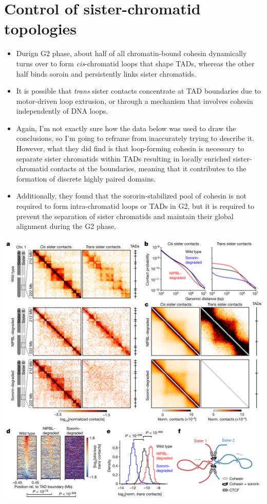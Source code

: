 \documentclass[plain,basic]{inVerba-notes}
\begin{document}
\section{Control of sister-chromatid topologies}
\begin{itemize}
    \item Durign G2 phase, about half of all chromatin-bound cohesin dynamically turns over to form \textit{cis}-chromatid loops that shape TADs, whereas the other half binds soroin and persistently links sister chromatids.
    \item It is possible that \textit{trans} sister contacts concentrate at TAD boundaries due to motor-driven loop extrusion, or through a mechanism that involves cohesin independently of DNA loops.
    \item Again, I'm not exactly sure how the data below was used to draw the conclusions, so I'm going to reframe from inaccurately trying to describe it. However, what they did find is that loop-forming cohesin is necessary to separate sister chromatids within TADs resulting in locally enriched sister-chromatid contacts at the boundaries, meaning that it contributes to the formation of discrete highly paired domains.
    \item Additionally, they found that the sororin-stabilized pool of cohesin is not required to form intra-chromatid loops or TADs in G2, but it is required to prevent the separation of sister chromatids and maintain their global alignment during the G2 phase.
\end{itemize}
\begin{center}
    \includegraphics[scale=0.38]{images/8-4.png}
\end{center}
\end{document}
